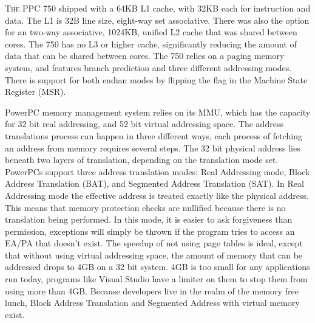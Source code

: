 \documentclass[10pt]{article}
\begin{document}
\textsc{The} PPC 750 shipped with a 64KB L1 cache, with 32KB each for instruction and data. The L1 is 32B line size, eight-way set associative. There was also the option for an two-way associative, 1024KB, unified L2 cache that was shared between cores. The 750 has no L3 or higher cache, significantly reducing the amount of data that can be shared between cores. The 750 relies on a paging memory system, and  features branch prediction and three different addressing modes. There is support for both endian modes by flipping the flag in the Machine State Register (MSR). 
\par
PowerPC memory management system relies on its MMU, which has the capacity for 32 bit real addressing, and 52 bit virtual addressing space. The address translations process can happen in three different ways, each process of fetching an address from memory requires several steps. The 32 bit physical address lies beneath two layers of translation, depending on the translation mode set. PowerPCs support three address translation modes: Real Addressing mode, Block Address Translation (BAT), and Segmented Address Translation (SAT). In Real Addressing mode the effective address is treated exactly like the  physical address. This means that memory protection checks are nullified because there is no translation being performed. In this mode, it is easier to ask forgiveness than permission, exceptions will simply be thrown if the program tries to access an EA/PA that doesn’t exist. The speedup of not using page tables is ideal, except that without using virtual addressing space, the amount of memory that can be addressed drops to 4GB on a 32 bit system. 4GB is too small for any applications run today, programs like Visual Studio have a limiter on them to stop them from using more than 4GB. Because developers live in the realm of the memory free lunch, Block Address Translation and Segmented Address with virtual memory exist. 
\end{document}
